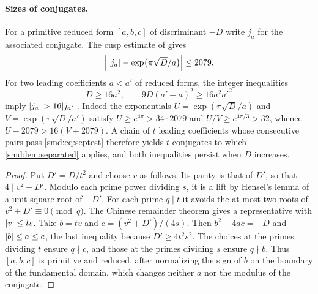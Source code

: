 \paragraph{Sizes of conjugates.}
For a primitive reduced form $[a,b,c]$ of discriminant $-D$ write $j_a$ for the associated
conjugate. The cusp estimate of \cite[\S2]{Bilu2022Trinomials} gives
\begin{equation}\label{smd:eq:cusp}
 \Bigl|\,\lvert j_a\rvert-\exp\bigl(\pi\sqrt D/a\bigr)\Bigr|\le2079 .
\end{equation}
For two leading coefficients $a<a'$ of reduced forms, the integer inequalities
\begin{equation}\label{smd:eq:septest}
 D\ge16a^2,\qquad 9D(a'-a)^2\ge16a^2a'^2
\end{equation}
imply $\lvert j_a\rvert>16\lvert j_{a'}\rvert$. Indeed the exponentials $U=\exp(\pi\sqrt D/a)$ and
$V=\exp(\pi\sqrt D/a')$ satisfy $U\ge e^{4\pi}>34\cdot2079$ and
$U/V\ge e^{4\pi/3}>32$, whence $U-2079>16(V+2079)$. A chain of $t$ leading
coefficients whose consecutive pairs pass \eqref{smd:eq:septest} therefore yields $t$
conjugates to which \cref{smd:lem:separated} applies, and both inequalities persist when
$D$ increases.


\begin{proof}
Put $D'=D/t^2$ and choose $v$ as follows. Its parity is that of $D'$, so that
$4\mid v^2+D'$. Modulo each prime power dividing $s$, it is a lift by Hensel's lemma of a
unit square root of $-D'$. For each prime $q\mid t$ it avoids the at most two roots of
$v^2+D'\equiv0\pmod q$. The Chinese remainder theorem gives a representative with
$\lvert v\rvert\le ts$. Take $b=tv$ and $c=(v^2+D')/(4s)$. Then $b^2-4ac=-D$ and
$\lvert b\rvert\le a\le c$, the last inequality because $D'\ge4t^2s^2$. The choices at the primes
dividing $t$ ensure $q\nmid c$, and those at the primes dividing $s$ ensure $q\nmid b$.
Thus $[a,b,c]$ is primitive and reduced, after normalizing the sign of $b$ on the boundary
of the fundamental domain, which changes neither $a$ nor the modulus of the conjugate.
\end{proof}

